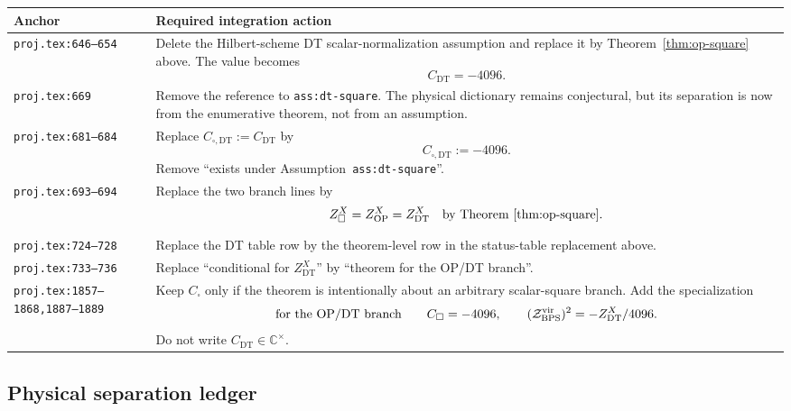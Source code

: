 \begin{center}
\small
\begin{tabular}{p{}p{}}
\hline
Anchor & Required integration action \\
\hline
\texttt{proj.tex:646--654} &
Delete the Hilbert-scheme DT scalar-normalization assumption and replace
it by Theorem~\ref{thm:op-square} above.  The value becomes
\[
C_{\mathrm{DT}}=-4096.
\]
\\
\texttt{proj.tex:669} &
Remove the reference to \texttt{ass:dt-square}.  The physical
dictionary remains conjectural, but its separation is now from the
enumerative theorem, not from an assumption. \\
\texttt{proj.tex:681--684} &
Replace \(C_{\square,\mathrm{DT}}:=C_{\mathrm{DT}}\) by
\[
C_{\square,\mathrm{DT}}:=-4096.
\]
Remove ``exists under Assumption~\texttt{ass:dt-square}''. \\
\texttt{proj.tex:693--694} &
Replace the two branch lines by
\[
Z^X_{\square}=Z^X_{\mathrm{OP}}=Z^X_{\mathrm{DT}}
\quad\hbox{by Theorem~\ref{thm:op-square}}.
\]
\\
\texttt{proj.tex:724--728} &
Replace the DT table row by the theorem-level row in the
status-table replacement above. \\
\texttt{proj.tex:733--736} &
Replace ``conditional for \(Z^X_{\mathrm{DT}}\)'' by
``theorem for the OP/DT branch''. \\
\texttt{proj.tex:1857--1868,1887--1889} &
Keep \(C_{\square}\) only if the theorem is intentionally about an
arbitrary scalar-square branch.  Add the specialization
\[
\hbox{for the OP/DT branch}\qquad
C_{\square}=-4096,\qquad
(\mathcal Z_{\mathrm{BPS}}^{\mathrm{vir}})^2
=-Z^X_{\mathrm{DT}}/4096.
\]
Do not write \(C_{\mathrm{DT}}\in\mathbb C^\times\). \\
\hline
\end{tabular}
\end{center}

\subsection{Physical separation ledger}

